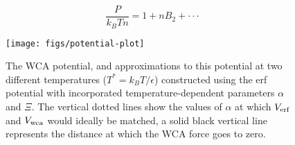 \documentclass[letterpaper,twocolumn,amsmath,amssymb,prb]{revtex4-1}
\newcommand\kirstiesays[1]{{\bf \color{red}K: #1}}
\begin{document}
\begin{equation}\frac{P}{k_BTn}=1+nB_2+ \cdot\cdot\cdot \end{equation}  %

\begin{figure}
\begin{center}
\texttt{[image: figs/potential-plot]}
\end{center}
\caption{The WCA potential, 
   and approximations to this potential
   at two different temperatures ($T^*=k_BT/\epsilon$) constructed using the erf potential 
   with incorporated temperature-dependent parameters $\alpha$ and $\Xi$. 
   The vertical dotted lines show the values of $\alpha$ at
   which $V_{\mathrm{erf}}$ and $V_{\mathrm{wca}}$ would ideally be matched, a solid black vertical 
   line represents the distance at which the WCA force goes to zero. }
\label{fig:potential-plot}
\end{figure}
\end{document}
